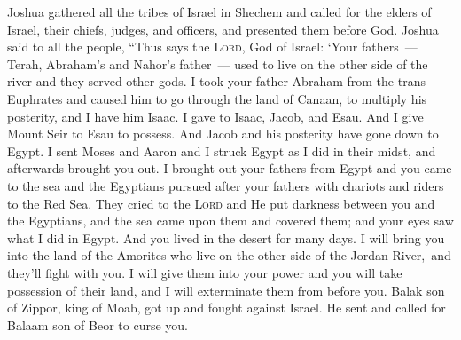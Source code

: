 
\begin{inparaenum}
   Joshua gathered all the tribes of Israel in Shechem and called for the elders of Israel, their chiefs, judges, and officers, and presented them before God.%
   Joshua said to all the people, ``Thus says the \textsc{Lord}, God of Israel: `Your fathers~--- Terah, Abraham's and Nahor's father~--- used to live on the other side of the river and they served other gods.%
   I took your father Abraham from the trans-Euphrates and caused him to go through the land of Canaan, to multiply his posterity, and I have him Isaac.%
   I gave to Isaac, Jacob, and Esau. And I give Mount Seir to Esau to possess. And Jacob and his posterity have gone down to Egypt.%
   I sent Moses and Aaron and I struck Egypt as I did in their midst, and afterwards brought you out.%
   I brought out your fathers from Egypt and you came to the sea and the Egyptians pursued after your fathers with chariots and riders to the Red Sea.%
   They cried to the \textsc{Lord} and He put darkness between you and the Egyptians, and the sea came upon them and covered them; and your eyes saw what I did in Egypt. And you lived in the desert for many days.%
   I will bring you into the land of the Amorites who live on the other side of the Jordan River,\understood\ and they'll fight with you. I will give them into your power and you will take possession of their land, and I will exterminate them from before you.%
   Balak son of Zippor, king of Moab, got up and fought against Israel. He sent and called for Balaam son of Beor to curse you.%

\end{inparaenum}
